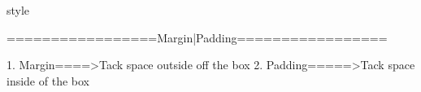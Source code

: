 style

=================Margin|Padding=================


1. Margin====>Tack space outside off the box
2. Padding=====>Tack space inside of the box

